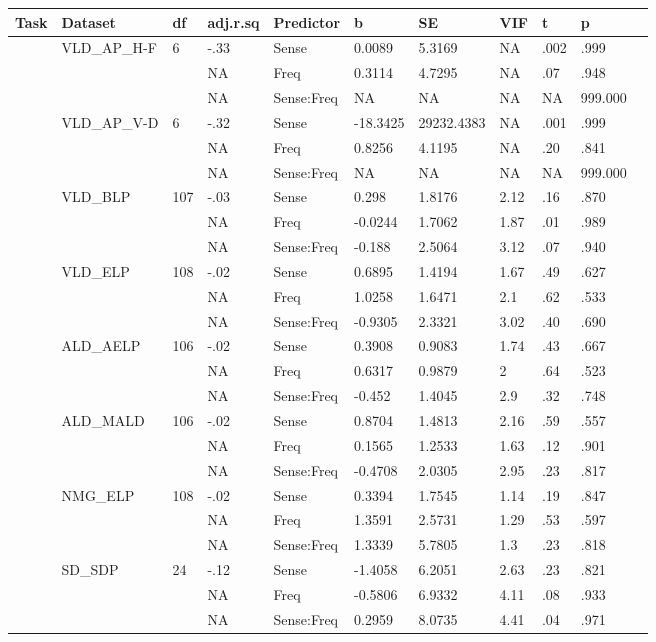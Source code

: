 \begin{table}[ht]
\centering
\begingroup\normalsize
\begin{tabular}{lllllllllll}
  \hline
Task & Dataset & df & adj.r.sq & Predictor & b & SE & VIF & t & p &  \\ 
  \hline
 & VLD\_AP\_H-F & 6 & -.33 & Sense & 0.0089 & 5.3169 & NA & .002 & .999 &   \\ 
   &  &  & NA & Freq & 0.3114 & 4.7295 & NA & .07 & .948 &   \\ 
   &  &  & NA & Sense:Freq & NA & NA & NA & NA & 999.000 &  \\ 
   & VLD\_AP\_V-D & 6 & -.32 & Sense & -18.3425 & 29232.4383 & NA & .001 & .999 &   \\ 
   &  &  & NA & Freq & 0.8256 & 4.1195 & NA & .20 & .841 &   \\ 
   &  &  & NA & Sense:Freq & NA & NA & NA & NA & 999.000 &  \\ 
   & VLD\_BLP & 107 & -.03 & Sense & 0.298 & 1.8176 & 2.12 & .16 & .870 &   \\ 
   &  &  & NA & Freq & -0.0244 & 1.7062 & 1.87 & .01 & .989 &   \\ 
   &  &  & NA & Sense:Freq & -0.188 & 2.5064 & 3.12 & .07 & .940 &   \\ 
   & VLD\_ELP & 108 & -.02 & Sense & 0.6895 & 1.4194 & 1.67 & .49 & .627 &   \\ 
   &  &  & NA & Freq & 1.0258 & 1.6471 & 2.1 & .62 & .533 &   \\ 
   &  &  & NA & Sense:Freq & -0.9305 & 2.3321 & 3.02 & .40 & .690 &   \\ 
   & ALD\_AELP & 106 & -.02 & Sense & 0.3908 & 0.9083 & 1.74 & .43 & .667 &   \\ 
   &  &  & NA & Freq & 0.6317 & 0.9879 & 2 & .64 & .523 &   \\ 
   &  &  & NA & Sense:Freq & -0.452 & 1.4045 & 2.9 & .32 & .748 &   \\ 
   & ALD\_MALD & 106 & -.02 & Sense & 0.8704 & 1.4813 & 2.16 & .59 & .557 &   \\ 
   &  &  & NA & Freq & 0.1565 & 1.2533 & 1.63 & .12 & .901 &   \\ 
   &  &  & NA & Sense:Freq & -0.4708 & 2.0305 & 2.95 & .23 & .817 &   \\ 
   & NMG\_ELP & 108 & -.02 & Sense & 0.3394 & 1.7545 & 1.14 & .19 & .847 &   \\ 
   &  &  & NA & Freq & 1.3591 & 2.5731 & 1.29 & .53 & .597 &   \\ 
   &  &  & NA & Sense:Freq & 1.3339 & 5.7805 & 1.3 & .23 & .818 &   \\ 
   & SD\_SDP & 24 & -.12 & Sense & -1.4058 & 6.2051 & 2.63 & .23 & .821 &   \\ 
   &  &  & NA & Freq & -0.5806 & 6.9332 & 4.11 & .08 & .933 &   \\ 
   &  &  & NA & Sense:Freq & 0.2959 & 8.0735 & 4.41 & .04 & .971 &   \\ 
   \hline
\end{tabular}
\endgroup
\end{table}
